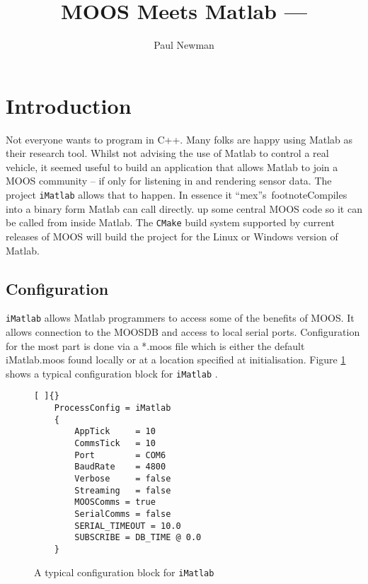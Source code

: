 \documentclass[a4paper,10pt]{article}
\title{MOOS Meets Matlab --- \code{iMatlab} }
\author{Paul Newman}
\newcommand{\Code}[1]{\texttt{#1} }
\newcommand{\code}[1]{\Code{#1} }
\begin{document}
\maketitle

\begin{center}
\end{center}

\section{Introduction}

Not everyone wants to program in C++. Many folks are happy using
Matlab as their research tool. Whilst not advising the use of
Matlab to control a real vehicle, it seemed useful to build an
application that allows Matlab to join a MOOS community -- if only
for listening in and rendering sensor data. The project
\code{iMatlab} allows that to happen. In essence it ``mex''s\
footnote{Compiles into a binary form Matlab can call directly.} up
some central MOOS code so it can be called from inside Matlab. The
\code{CMake} build system supported by current releases of MOOS
will build the project for the Linux or Windows version of Matlab.


\subsection{Configuration}

\code{iMatlab} allows Matlab programmers to access some of the
benefits of MOOS. It allows connection to the MOOSDB and access to
local serial ports. Configuration for the most part is done via a
*.moos file which is either the default iMatlab.moos found locally
or at a location specified at initialisation. Figure
\ref{fig:iMatlab} shows a typical configuration block for
\code{iMatlab}.

\begin{figure}[ht]
\begin{lstlisting}[ ]{}
    ProcessConfig = iMatlab
    {
        AppTick     = 10
        CommsTick   = 10
        Port        = COM6
        BaudRate    = 4800
        Verbose     = false
        Streaming   = false
        MOOSComms = true
        SerialComms = false
        SERIAL_TIMEOUT = 10.0
        SUBSCRIBE = DB_TIME @ 0.0
    }
\end{lstlisting}
\caption{A typical configuration block for \code{iMatlab}
}\label{fig:iMatlab}
\end{figure}
\end{document}
